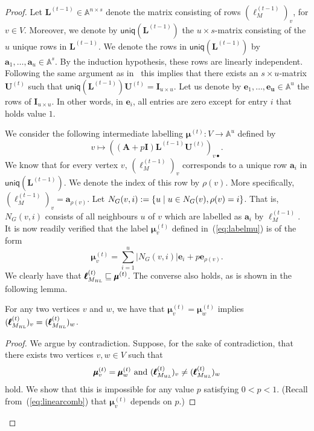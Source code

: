 \begin{proof}
Let $\mathbf{L}^{(t-1)}\in\mathbb{A}^{n\times s}$ denote the matrix consisting of rows $(\pmb{\ell}_M^{(t-1)})_v$, for $v\in V$.
Moreover, we denote by $\mathsf{uniq}(\mathbf{L}^{(t-1)})$ the $u\times s$-matrix consisting of the $u$ unique rows in $\mathbf{L}^{(t-1)}$. We denote the rows in $\mathsf{uniq}(\mathbf{L}^{(t-1)})$ by $\mathbf{a}_1,\ldots,\mathbf{a}_u\in\mathbb{A}^s$.
By the induction hypothesis, these rows are linearly independent. Following the same argument as in~\cite{grohewl} this implies that there exists an $s\times u$-matrix $\mathbf{U}^{(t)}$ such that $\mathsf{uniq}(\mathbf{L}^{(t-1)})\mathbf{U}^{(t)}=\mathbf{I}_{u\times u}$. 
Let us denote by $\mathbf{e}_1,\ldots,\mathbf{e_u}\in\mathbb{A}^u$ the rows of $\mathbf{I}_{u\times u}$. In other words, in $\mathbf{e}_i$, all entries are zero except for entry $i$ that holds value $1$. 

We consider the following intermediate labelling $\pmb{\mu}^{(t)}:V\to\mathbb{A}^u$ defined by
\begin{equation}
v\mapsto \left((\mathbf{A}+p\mathbf{I})\mathbf{L}^{(t-1)}\mathbf{U}^{(t)}\right)_{v\bullet}.\label{eq:labelmu}
\end{equation}
We know that for every vertex $v$, $(\pmb{\ell}_M^{(t-1)})_v$ corresponds to a unique row $\mathbf{a}_i$ in $\mathsf{uniq}(\mathbf{L}^{(t-1)})$. We denote the index of this row by $\rho(v)$. More specifically, $(\pmb{\ell}_M^{(t-1)})_v=\mathbf{a}_{\rho(v)}$. Let
$N_G(v,i):=\{u \mathrel{\mid} u\in N_G(v), \rho(v)=i\}$. That is, $N_G(v,i)$ consists of all neighbours $u$ of $v$ which are labelled as $\mathbf{a}_i$ by $\pmb{\ell}_M^{(t-1)}$.
It is now readily verified that the label $\pmb{\mu}^{(t)}_v$ defined in~(\ref{eq:labelmu}) is of the form 
\begin{equation}
\pmb{\mu}^{(t)}_v=\sum_{i=1}^u |N_G(v,i)|\mathbf{e}_i + p\mathbf{e}_{\rho(v)}.  \label{eq:linearcomb}
\end{equation}
We clearly have that $\pmb{\ell}_{M_{\textsl{WL}}}^{(t)}\sqsubseteq\pmb{\mu}^{(t)}$.
The converse also holds, as is shown in the following lemma.
\begin{lemma}
For any two vertices $v$ and $w$, we have that 
	$\pmb{\mu}^{(t)}_v=\pmb{\mu}^{(t)}_w$ implies 
	$(\pmb{\ell}_{M_{\textsl{WL}}}^{(t)})_v=(\pmb{\ell}_{M_{\textsl{WL}}}^{(t)})_w$.
\end{lemma}
\begin{proof}
We argue by contradiction. Suppose, for the sake of contradiction, that there exists two vertices $v,w\in V$ such that 
	\begin{equation}
		\pmb{\mu}^{(t)}_{v}=\pmb{\mu}^{(t)}_{w} \text{ and } (\pmb{\ell}_{M_{\textsl{WL}}}^{(t)})_v\neq(\pmb{\ell}_{M_{\textsl{WL}}}^{(t)})_w \label{eq:contra}
	\end{equation}
	hold.
We show that this is impossible for any value $p$ satisfying $0<p<1$. (Recall from~(\ref{eq:linearcomb}) that $\pmb{\mu}^{(t)}_v$ depends on $p$.)


\end{proof}
\end{proof}
